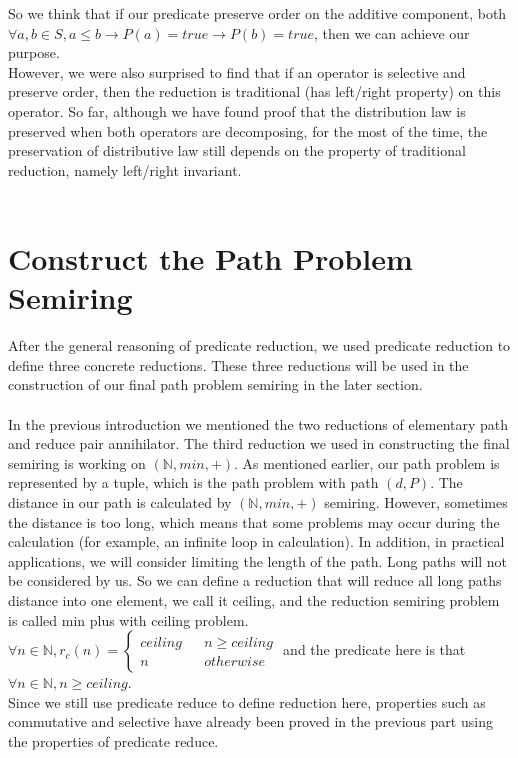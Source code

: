 \documentclass[a4paper,10pt]{article}
\begin{document}
So we think that if our predicate preserve order on the additive component, both $\forall a,b \in S, a \leq b \rightarrow P(a) = true \rightarrow P(b) = true$, then we can achieve our purpose.\\
However, we were also surprised to find that if an operator is selective and preserve order, then the reduction is traditional (has left/right property) on this operator.
So far, although we have found proof that the distribution law is preserved when both operators are decomposing, for the most of the time, the preservation of distributive law still depends on the property of traditional reduction, namely left/right invariant.\\\\

\section{Construct the Path Problem Semiring}
After the general reasoning of predicate reduction, we used predicate reduction to define three concrete reductions. These three reductions will be used in the construction of our final path problem semiring in the later section. \\\\
In the previous introduction we mentioned the two reductions of elementary path and reduce pair annihilator. The third reduction we used in constructing the final semiring is working on $(\mathbb{N},min,+)$. As mentioned earlier, our path problem is represented by a tuple, which is the path problem with path $(d,P)$. The distance in our path is calculated by $(\mathbb{N},min,+)$ semiring. However, sometimes the distance is too long, which means that some problems may occur during the calculation (for example, an infinite loop in calculation). In addition, in practical applications, we will consider limiting the length of the path. Long paths will not be considered by us. So we can define a reduction that will reduce all long paths distance into one element, we call it ceiling, and the reduction semiring problem is called min plus with ceiling problem. $\forall n \in \mathbb{N}, r_c(n) = \left\{
\begin{aligned}
ceiling &  & n \geq ceiling \\
n &  & otherwise 
\end{aligned}
\right.$ and the predicate here is that $\forall n \in \mathbb{N}, n \geq ceiling$.\\
Since we still use predicate reduce to define reduction here, properties such as commutative and selective have already been proved in the previous part using the properties of predicate reduce. 
\end{document}
